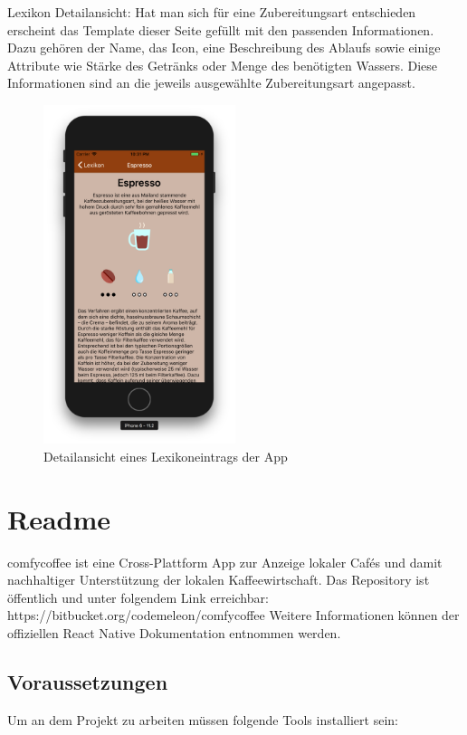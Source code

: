 Lexikon Detailansicht:
Hat man sich für eine Zubereitungsart entschieden erscheint das Template dieser Seite gefüllt mit den passenden Informationen.
Dazu gehören der Name, das Icon, eine Beschreibung des Ablaufs sowie einige Attribute wie Stärke des Getränks oder Menge des benötigten Wassers.
Diese Informationen sind an die jeweils ausgewählte Zubereitungsart angepasst.

\begin{figure}[H]
    \centering
		\includegraphics[width=0.5\textwidth]{Bilder/app-lexikon-detail.png}
		\caption{Detailansicht eines Lexikoneintrags der App}
\end{figure}




\section{Readme}
comfycoffee ist eine Cross-Plattform App zur Anzeige lokaler Cafés und damit nachhaltiger Unterstützung der lokalen Kaffeewirtschaft.
Das Repository ist öffentlich und unter folgendem Link erreichbar: https://bitbucket.org/codemeleon/comfycoffee
Weitere Informationen können der offiziellen React Native Dokumentation entnommen werden.

\subsection{Voraussetzungen}
Um an dem Projekt zu arbeiten müssen folgende Tools installiert sein:

